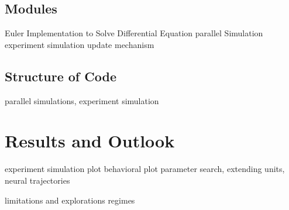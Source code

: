 \documentclass[9pt]{article}
\begin{document}
\subsection{Modules}
Euler Implementation to Solve Differential Equation
parallel Simulation
experiment simulation
update mechanism

\subsection{Structure of Code}
parallel simulations, experiment simulation

\section{Results and Outlook}
experiment simulation plot
behavioral plot
parameter search, extending units, neural trajectories

limitations and explorations regimes 
\end{document}
